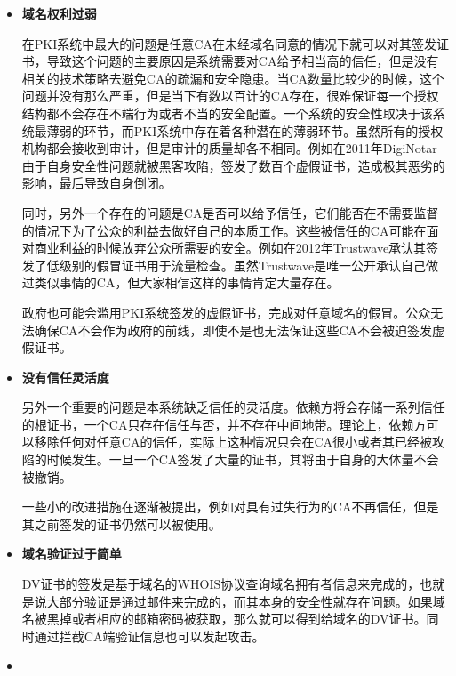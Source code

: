 \begin{itemize}
	\item

	\noindent\textbf{域名权利过弱}

	在PKI系统中最大的问题是任意CA在未经域名同意的情况下就可以对其签发证书，导致这个问题的主要原因是系统需要对CA给予相当高的信任，但是没有相关的技术策略去避免CA的疏漏和安全隐患。当CA数量比较少的时候，这个问题并没有那么严重，但是当下有数以百计的CA存在，很难保证每一个授权结构都不会存在不端行为或者不当的安全配置。一个系统的安全性取决于该系统最薄弱的环节，而PKI系统中存在着各种潜在的薄弱环节。虽然所有的授权机构都会接收到审计，但是审计的质量却各不相同。例如在2011年DigiNotar由于自身安全性问题就被黑客攻陷\cite{prins2011diginotar}，签发了数百个虚假证书，造成极其恶劣的影响，最后导致自身倒闭。

	同时，另外一个存在的问题是CA是否可以给予信任，它们能否在不需要监督的情况下为了公众的利益去做好自己的本质工作。这些被信任的CA可能在面对商业利益的时候放弃公众所需要的安全。例如在2012年Trustwave承认其签发了低级别的假冒证书用于流量检查。虽然Trustwave是唯一公开承认自己做过类似事情的CA，但大家相信这样的事情肯定大量存在。

	政府也可能会滥用PKI系统签发的虚假证书，完成对任意域名的假冒。公众无法确保CA不会作为政府的前线，即使不是也无法保证这些CA不会被迫签发虚假证书。



	\item

	\noindent\textbf{没有信任灵活度}

	另外一个重要的问题是本系统缺乏信任的灵活度。依赖方将会存储一系列信任的根证书，一个CA只存在信任与否，并不存在中间地带。理论上，依赖方可以移除任何对任意CA的信任，实际上这种情况只会在CA很小或者其已经被攻陷的时候发生。一旦一个CA签发了大量的证书，其将由于自身的大体量不会被撤销。

	一些小的改进措施在逐渐被提出，例如对具有过失行为的CA不再信任，但是其之前签发的证书仍然可以被使用。

	\item

	\noindent\textbf{域名验证过于简单}

	DV证书的签发是基于域名的WHOIS协议查询域名拥有者信息来完成的，也就是说大部分验证是通过邮件来完成的，而其本身的安全性就存在问题。如果域名被黑掉或者相应的邮箱密码被获取，那么就可以得到给域名的DV证书。同时通过拦截CA端验证信息也可以发起攻击。



	\item 


\end{itemize}
